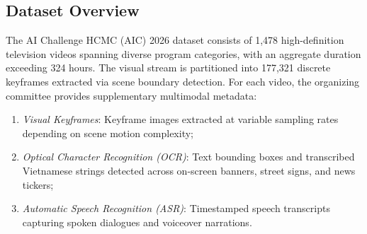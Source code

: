 \documentclass[runningheads]{llncs}
\begin{document}
\subsection{Dataset Overview}
The AI Challenge HCMC (AIC) 2026 dataset consists of 1,478 high-definition television videos spanning diverse program categories, with an aggregate duration exceeding 324 hours. The visual stream is partitioned into 177,321 discrete keyframes extracted via scene boundary detection. For each video, the organizing committee provides supplementary multimodal metadata:
\begin{enumerate}[label=(\alph*)]
    \item \textit{Visual Keyframes}: Keyframe images extracted at variable sampling rates depending on scene motion complexity;
    \item \textit{Optical Character Recognition (OCR)}: Text bounding boxes and transcribed Vietnamese strings detected across on-screen banners, street signs, and news tickers;
    \item \textit{Automatic Speech Recognition (ASR)}: Timestamped speech transcripts capturing spoken dialogues and voiceover narrations.
\end{enumerate}
\end{document}

